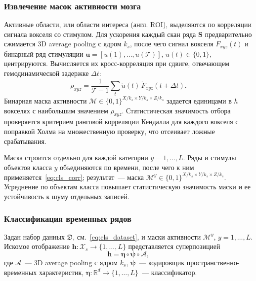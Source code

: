 \subsubsection{Извлечение масок активности мозга}\label{sec3:cls_mask}
Активные области, или области интереса (англ. ROI), выделяются по корреляции сигнала вокселя со стимулом. Для ускорения каждый скан ряда $\mathbf{S}$ предварительно сжимается 3D average pooling с ядром $k_s$, после чего сигнал вокселя $F_{xyz}(t)$ и бинарный ряд стимуляции $\mathbf{u} = [u(1), \ldots, u(\mathcal{T})]$, $u(t)\in\{0,1\}$, центрируются. Вычисляется их кросс-корреляция при сдвиге, отвечающем гемодинамической задержке $\Delta t$:
\begin{equation}\label{eq:cls_corr}
\rho_{xyz} = \frac{1}{\mathcal{T}-1} \sum_{t} \mathring{u}(t)\, \mathring{F}_{xyz}(t + \Delta t).
\end{equation}
Бинарная маска активности $\mathcal{M} \in \{0,1\}^{X/k_s \times Y/k_s \times Z/k_s}$ задается единицами в $h$ вокселях с наибольшим значением $\rho_{xyz}$. Статистическая значимость отбора проверяется критерием ранговой корреляции Кендалла для каждого вокселя с поправкой Холма на множественную проверку, что отсеивает ложные срабатывания.

Маска строится отдельно для каждой категории $y = 1, \ldots, L$. Ряды и стимулы объектов класса $y$ объединяются по времени, после чего к ним применяется~\eqref{eq:cls_corr}; результат~--- маска $\mathcal{M}^{y} \in \{0,1\}^{X/k_s \times Y/k_s \times Z/k_s}$. Усреднение по объектам класса повышает статистическую значимость маски и ее устойчивость к шуму отдельных записей.

\subsubsection{Классификация временных рядов}\label{sec3:cls_clf}
Задан набор данных $\mathfrak{D}$, см.~\eqref{eq:cls_dataset}, и маски активности $\mathcal{M}^{y}$, $y = 1, \ldots, L$. Искомое отображение $\mathbf{h}: \mathcal{X}_s \to \{1,\ldots,L\}$ представляется суперпозицией
\begin{equation}\label{eq:cls_model}
\mathbf{h} = \boldsymbol{\eta} \circ \boldsymbol{\psi} \circ \mathcal{A},
\end{equation}
где $\mathcal{A}$~--- 3D average pooling с ядром $k_s$, $\boldsymbol{\psi}$~--- кодировщик пространственно-временных характеристик, $\boldsymbol{\eta}: \mathbb{R}^{d} \to \{1,\ldots,L\}$~--- классификатор.

